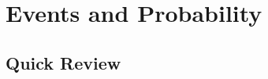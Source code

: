 \documentclass[main.tex]{subfiles}
\begin{document}
\section{Events and Probability}

\subsection*{Quick Review}
\end{document}
